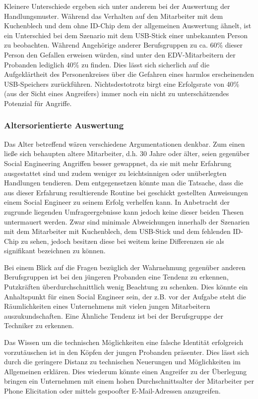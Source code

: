 Kleinere Unterschiede ergeben sich unter anderem bei der Auswertung der Handlungsmuster.
Während das Verhalten auf den Mitarbeiter mit dem Kuchenblech und dem ohne ID-Chip dem der allgemeinen Auswertung ähnelt, ist ein Unterschied bei dem Szenario mit dem USB-Stick einer unbekannten Person zu beobachten.
Während Angehörige anderer Berufsgruppen zu ca. 60\% dieser Person den Gefallen erweisen würden, sind unter den EDV-Mitarbeitern der Probanden lediglich 40\% zu finden.
Dies lässt sich sicherlich auf die Aufgeklärtheit des Personenkreises über die Gefahren eines harmlos erscheinenden USB-Speichers zurückführen.
Nichtsdestotrotz birgt eine Erfolgsrate von 40\% (aus der Sicht eines Angreifers) immer noch ein nicht zu unterschätzendes Potenzial für Angriffe.

\subsubsection{Altersorientierte Auswertung}\label{ref:altersorientierte-auswertung}

Das Alter betreffend wären verschiedene Argumentationen denkbar.
Zum einen ließe sich behaupten altere Mitarbeiter, d.h. 30 Jahre oder älter, seien gegenüber Social Engineering Angriffen besser gewappnet, da sie mit mehr Erfahrung ausgestattet sind und zudem weniger zu leichtsinnigen oder unüberlegten Handlungen tendieren.
Dem entgegensetzen könnte man die Tatsache, dass die aus dieser Erfahrung resultierende Routine bei geschickt gestellten Anweisungen einem Social Engineer zu seinem Erfolg verhelfen kann.
In Anbetracht der zugrunde liegenden Umfrageergebnisse kann jedoch keine dieser beiden Thesen untermauert werden.
Zwar sind minimale Abweichungen innerhalb der Szenarien mit dem Mitarbeiter mit Kuchenblech, dem USB-Stick und dem fehlenden ID-Chip zu sehen, jedoch besitzen diese bei weitem keine Differenzen sie als signifikant bezeichnen zu können.

Bei einem Blick auf die Fragen bezüglich der Wahrnehmung gegenüber anderen Berufsgruppen ist bei den jüngeren Probanden eine Tendenz zu erkennen, Putzkräften überdurchschnittlich wenig Beachtung zu schenken.
Dies könnte ein Anhaltspunkt für einen Social Engineer sein, der z.B. vor der Aufgabe steht die Räumlichkeiten eines Unternehmens mit vielen jungen Mitarbeitern auszukundschaften.
Eine Ähnliche Tendenz ist bei der Berufsgruppe der Techniker zu erkennen.

Das Wissen um die technischen Möglichkeiten eine falsche Identität erfolgreich vorzutäuschen ist in den Köpfen der jungen Probanden präsenter.
Dies lässt sich durch die geringere Distanz zu technischen Neuerungen und Möglichkeiten im Allgemeinen erklären.
Dies wiederum könnte einen Angreifer zu der Überlegung bringen ein Unternehmen mit einem hohen Durchschnittsalter der Mitarbeiter per Phone Elicitation oder mittels gespoofter E-Mail-Adressen anzugreifen.